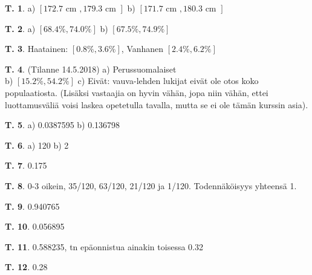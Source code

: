 \documentclass[12pt,leqno,a4paper,oneside]{amsart}
\theoremstyle{definition}
\newtheorem{exercise}{T.}
\theoremstyle{remark}
\numberwithin{equation}{section}
\begin{document}
\begin{exercise}
 a) $[172.7\text{ cm }, 179.3\text{ cm }]$
 b) $[171.7\text{ cm }, 180.3\text{ cm }]$
\end{exercise}




\begin{exercise}
a) $[68.4\%, 74.0\% ]$ 
b) $[67.5\%, 74.9\% ]$ 
\end{exercise}

\begin{exercise}
 Haatainen: $[0.8\%, 3.6\% ]$, Vanhanen $[2.4\%, 6.2\% ]$
\end{exercise}


\begin{exercise} (Tilanne 14.5.2018)
 a) Perussuomalaiset\\
 b) $[15.2\%, 54.2\% ]$
 c) Eivät: vauva-lehden lukijat eivät ole otos koko populaatiosta. (Lisäksi vastaajia on hyvin vähän, jopa niin vähän, ettei 
 luottamusväliä voisi laskea opetetulla tavalla, mutta se ei ole tämän kurssin asia).
\end{exercise}

\begin{exercise}
 a) 0.0387595 b) 0.136798
\end{exercise}


\begin{exercise}
a) 120 b) 2 
\end{exercise}


\begin{exercise}
 0.175
\end{exercise}

\begin{exercise}
 0-3 oikein, 35/120, 63/120, 21/120 ja 1/120. Todennäköisyys yhteensä 1.
\end{exercise}

\begin{exercise}
 0.940765
\end{exercise}

\begin{exercise}
 0.056895
\end{exercise}

\begin{exercise}
0.588235, tn epäonnistua ainakin toisessa 0.32 
\end{exercise}

\begin{exercise}
 0.28
\end{exercise}
\end{document}
